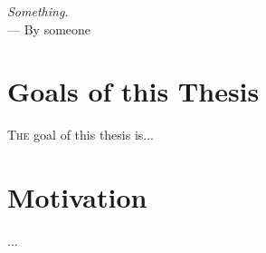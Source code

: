 \label{chap:introduction}
\begin{flushright}{\slshape
    Something.} \\ \medskip
    --- {By someone}
\end{flushright}
\minitoc\mtcskip
\vfill



\section{Goals of this Thesis} %


\lettrine{T}{he} goal of this thesis is...

\section{Motivation}
\label{sec:intro}

...